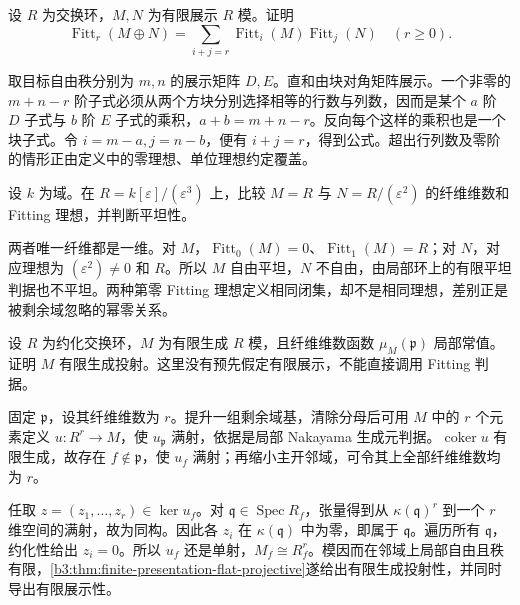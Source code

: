 \begin{exercise}\label{b3:ex:12-fittings-direct-sum}
	设 \(R\) 为交换环，\(M,N\) 为有限展示 \(R\) 模。证明
	\[
		\operatorname{Fitt}_r(M\oplus N) =\sum_{i+j=r}\operatorname{Fitt}_i(M)\operatorname{Fitt}_j(N) \quad(r\ge0).
	\]
\end{exercise}
\begin{solution}
	取目标自由秩分别为 \(m,n\) 的展示矩阵 \(D,E\)。直和由块对角矩阵展示。一个非零的 \(m+n-r\) 阶子式必须从两个方块分别选择相等的行数与列数，因而是某个 \(a\) 阶 \(D\) 子式与 \(b\) 阶 \(E\) 子式的乘积，\(a+b=m+n-r\)。反向每个这样的乘积也是一个块子式。令 \(i=m-a,j=n-b\)，便有 \(i+j=r\)，得到公式。超出行列数及零阶的情形正由定义中的零理想、单位理想约定覆盖。
\end{solution}

\begin{exercise}\label{b3:ex:12-fitting-nilpotence}
	设 \(k\) 为域。在 \(R=k[\varepsilon]/(\varepsilon^3)\) 上，比较 \(M=R\) 与 \(N=R/(\varepsilon^2)\) 的纤维维数和 Fitting 理想，并判断平坦性。
\end{exercise}
\begin{solution}
	两者唯一纤维都是一维。对 \(M\)，\(\operatorname{Fitt}_0(M)=0\)、\(\operatorname{Fitt}_1(M)=R\)；对 \(N\)，对应理想为 \((\varepsilon^2)\ne0\) 和 \(R\)。所以 \(M\) 自由平坦，\(N\) 不自由，由局部环上的有限平坦判据也不平坦。两种第零 Fitting 理想定义相同闭集，却不是相同理想，差别正是被剩余域忽略的幂零关系。
\end{solution}

\begin{exercise}\label{b3:ex:12-reduced-constant-fiber}
	设 \(R\) 为约化交换环，\(M\) 为有限生成 \(R\) 模，且纤维维数函数 \(\mu_M(\mathfrak p)\) 局部常值。证明 \(M\) 有限生成投射。这里没有预先假定有限展示，不能直接调用 Fitting 判据。
\end{exercise}
\begin{solution}
	固定 \(\mathfrak p\)，设其纤维维数为 \(r\)。提升一组剩余域基，清除分母后可用 \(M\) 中的 \(r\) 个元素定义 \(u:R^r\to M\)，使 \(u_{\mathfrak p}\) 满射，依据是局部 Nakayama 生成元判据。\(\operatorname{coker}u\) 有限生成，故存在 \(f\notin\mathfrak p\)，使 \(u_f\) 满射；再缩小主开邻域，可令其上全部纤维维数均为 \(r\)。

	任取 \(z=(z_1,\ldots,z_r)\in\ker u_f\)。对 \(\mathfrak q\in\operatorname{Spec}R_f\)，张量得到从 \(\kappa(\mathfrak q)^r\) 到一个 \(r\) 维空间的满射，故为同构。因此各 \(z_i\) 在 \(\kappa(\mathfrak q)\) 中为零，即属于 \(\mathfrak q\)。遍历所有 \(\mathfrak q\)，约化性给出 \(z_i=0\)。所以 \(u_f\) 还是单射，\(M_f\cong R_f^r\)。模因而在邻域上局部自由且秩有限，\cref{b3:thm:finite-presentation-flat-projective}遂给出有限生成投射性，并同时导出有限展示性。
\end{solution}

